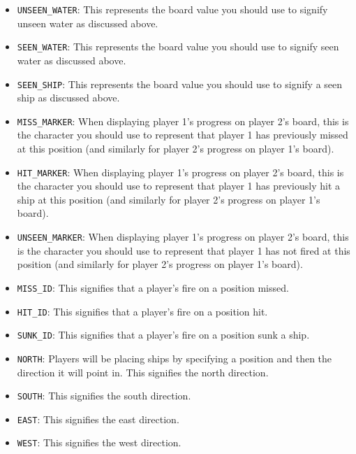\documentclass{article}
\begin{document}
\begin{itemize}
    \item \texttt{UNSEEN\_WATER}: This represents the board value you should use to signify unseen water as discussed above. 
    
    \item \texttt{SEEN\_WATER}: This represents the board value you should use to signify seen water as discussed above. 
    
    \item \texttt{SEEN\_SHIP}: This represents the board value you should use to signify a seen ship as discussed above.
    
    \item \texttt{MISS\_MARKER}: When displaying player 1's progress on player 2's board, this is the character you should use to represent that player 1 has previously missed at this position (and similarly for player 2's progress on player 1's board). 
    
    \item \texttt{HIT\_MARKER}: When displaying player 1's progress on player 2's board, this is the character you should use to represent that player 1 has previously hit a ship at this position (and similarly for player 2's progress on player 1's board).
    
    \item \texttt{UNSEEN\_MARKER}: When displaying player 1's progress on player 2's board, this is the character you should use to represent that player 1 has not fired at this position (and similarly for player 2's progress on player 1's board).
    
    \item \texttt{MISS\_ID}: This signifies that a player's fire on a position missed.
    
    \item \texttt{HIT\_ID}: This signifies that a player's fire on a position hit.
    
    \item \texttt{SUNK\_ID}: This signifies that a player's fire on a position sunk a ship.
    
    \item \texttt{NORTH}: Players will be placing ships by specifying a position and then the direction it will point in. This signifies the north direction.
    
    \item \texttt{SOUTH}: This signifies the south direction.
    
    \item \texttt{EAST}: This signifies the east direction.
    
    \item \texttt{WEST}: This signifies the west direction.
\end{itemize}
\end{document}
